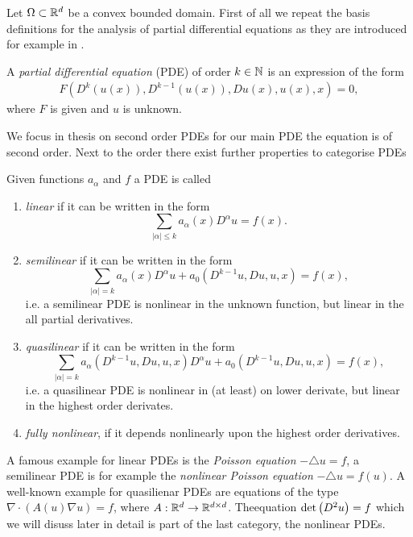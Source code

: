 Let $\Omega \subset \mathbb{R}^d $ be a convex bounded domain.
First of all we repeat the basis definitions for the analysis of partial differential equations as they are introduced for example in \cite{Evans1998}.
\begin{definition}
 A \emph{partial differential equation} (PDE) of order $k\in \mathbb{N}$ is an expression of the form
\begin{align}
	F(D^k(u(x)), D^{k-1}(u(x)), Du(x), u(x), x) = 0, \label{eq:general PDE}
\end{align}
where $F$ is given and $u$ is unknown.
\end{definition}
We focus in thesis on second order PDEs for our main PDE the \MA equation is of second order. Next to the order there exist further properties to categorise PDEs
\begin{definition}
	Given functions $a_{\alpha} $ and $f$ a PDE is called
	\begin{enumerate}
		\item \emph{linear} if it can be written in the form
		\[
			\sum_{|\alpha| \leq k} a_{\alpha} (x) D^{\alpha} u = f(x).
		\] 
		
		\item \emph{semilinear} if it can be written in the form
		\[
			\sum_{|\alpha| = k} a_{\alpha}(x) D^{\alpha} u + a_0(D^{k-1}u, Du, u, x)= f(x),
		\]	
		i.e. a semilinear PDE is nonlinear in the unknown function, but linear in the all partial derivatives.
		
		\item \emph{quasilinear} if it can be written in the form
		\[
			\sum_{|\alpha| = k} a_{\alpha}(D^{k-1}u, Du, u, x) D^{\alpha} u + a_0(D^{k-1}u, Du, u, x)= f(x),
		\]	
		i.e. a quasilinear PDE is nonlinear in (at least) on lower derivate, but linear in the highest order derivates.
		
		\item \emph{fully nonlinear}, if it depends nonlinearly upon the highest order derivatives.
	\end{enumerate}
\end{definition}
A famous example for linear PDEs is the \emph{Poisson equation} $-\triangle u = f$, a semilinear PDE is for example the \emph{nonlinear Poisson equation} $-\triangle u = f(u)$. A well-known example for quasilienar PDEs are equations of the type $\nabla \cdot (A(u) \nabla u) = f$, where $A: \mathbb{R}^d \rightarrow \mathbb{R}^{d \times d}  $. The\MA equation $\det{\left(D^2 u\right)} = f$ which we will disuss later in detail is part of the last category, the nonlinear PDEs. 

